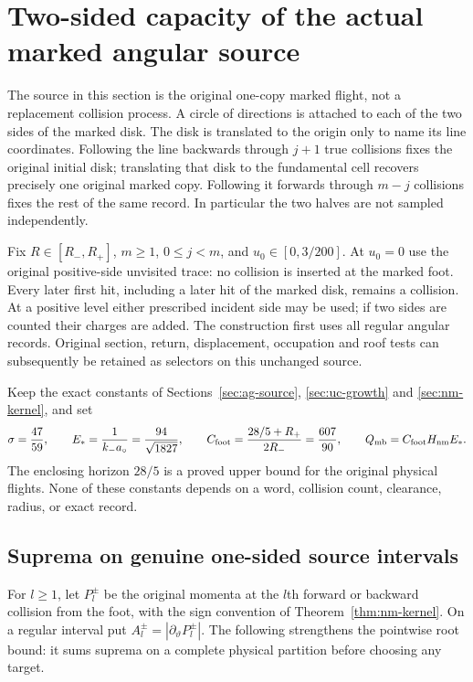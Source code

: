 \section{Two-sided capacity of the actual marked angular source}
\label{sec:mb-capacity}

The source in this section is the original one-copy marked flight, not a
replacement collision process.  A circle of directions is attached to
each of the two sides of the marked disk.  The disk is translated to
the origin only to name its line coordinates.  Following the line
backwards through $j+1$ true collisions fixes the original initial
disk; translating that disk to the fundamental cell recovers precisely
one original marked copy.  Following it forwards through $m-j$
collisions fixes the rest of the same record.  In particular the two
halves are not sampled independently.

Fix $R\in[R_-,R_+]$, $m\ge1$, $0\le j<m$, and
$u_0\in[0,3/200]$.  At $u_0=0$ use the original positive-side
unvisited trace: no collision is inserted at the marked foot.  Every
later first hit, including a later hit of the marked disk, remains
a collision.  At a positive level either prescribed incident side
may be used; if two sides are counted their charges are added.
The construction first uses all regular angular records.  Original
section, return, displacement, occupation and roof tests can
subsequently be retained as selectors on this unchanged source.

Keep the exact constants of Sections~\ref{sec:ag-source},
\ref{sec:uc-growth} and \ref{sec:nm-kernel}, and set
\begin{equation}\label{eq:mb-constants}
 \sigma=\frac{47}{59},\qquad
 E_*=\frac1{k_-a_\circ}=\frac{94}{\sqrt{1827}},\qquad
 C_{\rm foot}=\frac{28/5+R_+}{2R_-}=\frac{607}{90},
 \qquad Q_{\rm mb}=C_{\rm foot}H_{\rm nm}E_* .
\end{equation}
The enclosing horizon $28/5$ is a proved upper bound for the
original physical flights.  None of these constants depends on a
word, collision count, clearance, radius, or exact record.

\subsection{Suprema on genuine one-sided source intervals}

For $l\ge1$, let $P_l^\pm$ be the original momenta at the $l$th
forward or backward collision from the foot, with the sign convention
of Theorem~\ref{thm:nm-kernel}.  On a regular interval put
$A_l^\pm=|\partial_\vartheta P_l^\pm|$.
The following strengthens the pointwise root bound: it sums
suprema on a complete physical partition before choosing any target.

